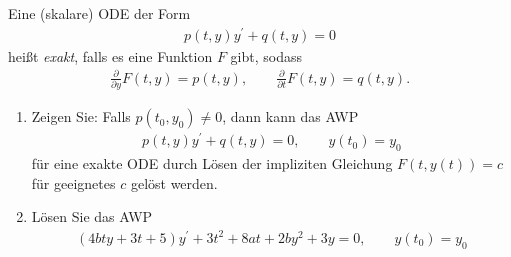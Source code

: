 \begin{exercise}
Eine (skalare) ODE der Form
\begin{align}\label{ode}
  p(t,y)y^{\prime} + q(t,y) = 0
\end{align}
heißt \textit{exakt}, falls es eine Funktion $F$ gibt, sodass
\begin{align*}
  \frac{\partial}{\partial y}F(t,y) = p(t,y), \qquad \frac{\partial}{\partial t}F(t,y) = q(t,y).
\end{align*}
\begin{enumerate}[label = \textbf{\alph*)}]
  \item Zeigen Sie: Falls $p(t_0,y_0) \neq 0$, dann kann das AWP
  \begin{align*}
    p(t,y)y^{\prime} + q(t,y) = 0, \qquad y(t_0) = y_0
  \end{align*}
  für eine exakte ODE durch Lösen der impliziten Gleichung $F(t,y(t)) = c$
  für geeignetes $c$ gelöst werden.
  \item Lösen Sie das AWP
  \begin{align*}
    (4bty + 3t + 5)y^{\prime} + 3t^2 + 8at + 2by^2 + 3y = 0, \qquad y(t_0) = y_0
  \end{align*}
\end{enumerate}
\end{exercise}
